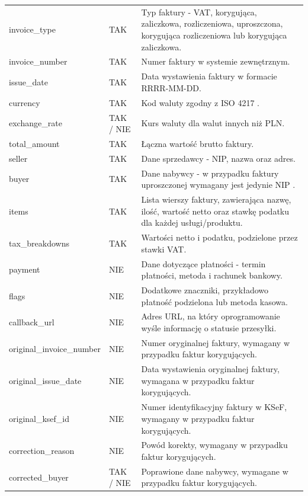 \begin{small}
\begin{longtable}{>{\raggedright\arraybackslash}p{3.8cm} >{\raggedright\arraybackslash}p{2.6cm} >{\raggedright\arraybackslash}p{6.6cm}}
invoice\_type & TAK & Typ faktury - VAT, korygująca, zaliczkowa, rozliczeniowa, uproszczona, korygująca rozliczeniowa lub korygująca zaliczkowa. \\
invoice\_number & TAK & Numer faktury w systemie zewnętrznym. \\
issue\_date & TAK & Data wystawienia faktury w formacie RRRR-MM-DD. \\
currency & TAK & Kod waluty zgodny z ISO 4217 \parencite{iso4217}. \\
exchange\_rate & TAK / NIE & Kurs waluty dla walut innych niż PLN. \\
total\_amount & TAK & Łączna wartość brutto faktury. \\
seller & TAK & Dane sprzedawcy - NIP, nazwa oraz adres. \\
buyer & TAK & Dane nabywcy - w przypadku faktury uproszczonej wymagany jest jedynie NIP \parencite{ksef_fa3_brochure}. \\
items & TAK & Lista wierszy faktury, zawierająca nazwę, ilość, wartość netto oraz stawkę podatku dla każdej usługi/produktu. \\
tax\_breakdowns & TAK & Wartości netto i podatku, podzielone przez stawki VAT. \\
payment & NIE & Dane dotyczące płatności - termin płatności, metoda i rachunek bankowy. \\
flags & NIE & Dodatkowe znaczniki, przykładowo płatność podzielona lub metoda kasowa. \\
callback\_url & NIE & Adres URL, na który oprogramowanie wyśle informację o statusie przesyłki. \\
original\_invoice\_number & NIE & Numer oryginalnej faktury, wymagany w przypadku faktur korygujących. \\
original\_issue\_date & NIE & Data wystawienia oryginalnej faktury, wymagana w przypadku faktur korygujących. \\
original\_ksef\_id & NIE & Numer identyfikacyjny faktury w KSeF, wymagany w przypadku faktur korygujących. \\
correction\_reason & NIE & Powód korekty, wymagany w przypadku faktur korygujących. \\
corrected\_buyer & TAK / NIE & Poprawione dane nabywcy, wymagane w przypadku faktur korygujących. \\
\end{longtable}
\end{small}

